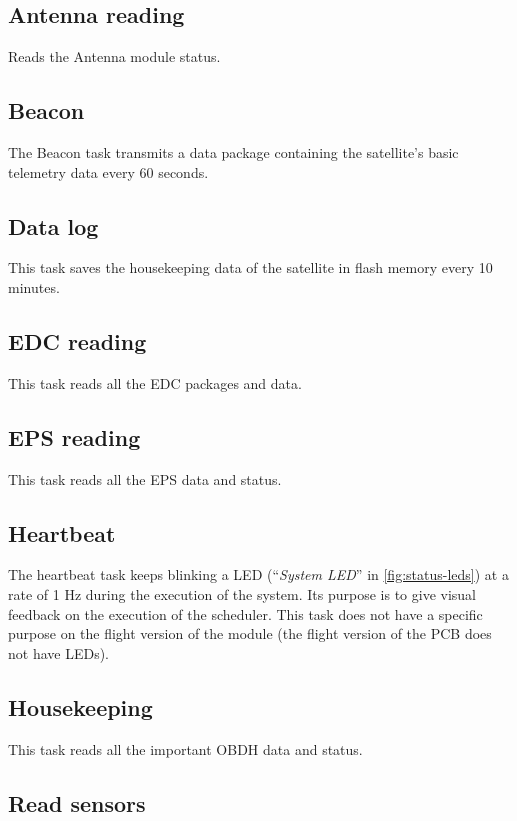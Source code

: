 \subsection{Antenna reading}

Reads the Antenna module status.

\subsection{Beacon}

The Beacon task transmits a data package containing the satellite's basic telemetry data every 60 seconds.

\subsection{Data log}

This task saves the housekeeping data of the satellite in flash memory every 10 minutes.

\subsection{EDC reading}

This task reads all the EDC packages and data.

\subsection{EPS reading}

This task reads all the EPS data and status.

\subsection{Heartbeat}

The heartbeat task keeps blinking a LED (``\textit{System LED}'' in \autoref{fig:status-leds}) at a rate of 1 Hz during the execution of the system. Its purpose is to give visual feedback on the execution of the scheduler. This task does not have a specific purpose on the flight version of the module (the flight version of the PCB does not have LEDs).

\subsection{Housekeeping}

This task reads all the important OBDH data and status.

\subsection{Read sensors}

